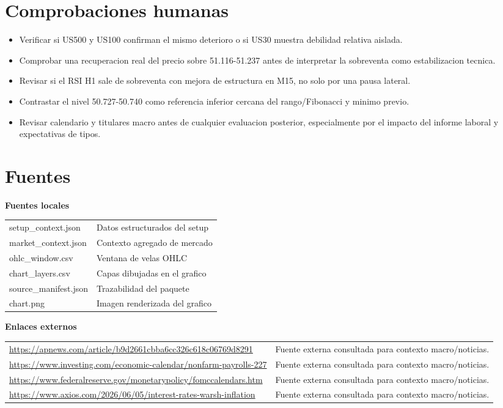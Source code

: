 \documentclass[11pt,a4paper]{article}
\begin{document}
\section*{Comprobaciones humanas}
\begin{itemize}
  \item Verificar si US500 y US100 confirman el mismo deterioro o si US30 muestra debilidad relativa aislada.
  \item Comprobar una recuperacion real del precio sobre 51.116-51.237 antes de interpretar la sobreventa como estabilizacion tecnica.
  \item Revisar si el RSI H1 sale de sobreventa con mejora de estructura en M15, no solo por una pausa lateral.
  \item Contrastar el nivel 50.727-50.740 como referencia inferior cercana del rango/Fibonacci y minimo previo.
  \item Revisar calendario y titulares macro antes de cualquier evaluacion posterior, especialmente por el impacto del informe laboral y expectativas de tipos.
\end{itemize}

\section*{Fuentes}
\textbf{Fuentes locales}\par
\begin{tabularx}{\textwidth}{p{4.2cm}X}
setup\_context.json & Datos estructurados del setup \\
market\_context.json & Contexto agregado de mercado \\
ohlc\_window.csv & Ventana de velas OHLC \\
chart\_layers.csv & Capas dibujadas en el grafico \\
source\_manifest.json & Trazabilidad del paquete \\
chart.png & Imagen renderizada del grafico \\
\end{tabularx}

\vspace{0.45em}
\textbf{Enlaces externos}\par
\begin{tabularx}{\textwidth}{p{7.4cm}X}
\href{\detokenize{https://apnews.com/article/b9d2661cbba6cc326c618c06769d8291}}{https://apnews.com/article/b9d2661cbba6cc326c618c06769d8291} & Fuente externa consultada para contexto macro/noticias. \\
\href{\detokenize{https://www.investing.com/economic-calendar/nonfarm-payrolls-227}}{https://www.investing.com/economic-calendar/nonfarm-payrolls-227} & Fuente externa consultada para contexto macro/noticias. \\
\href{\detokenize{https://www.federalreserve.gov/monetarypolicy/fomccalendars.htm}}{https://www.federalreserve.gov/monetarypolicy/fomccalendars.htm} & Fuente externa consultada para contexto macro/noticias. \\
\href{\detokenize{https://www.axios.com/2026/06/05/interest-rates-warsh-inflation}}{https://www.axios.com/2026/06/05/interest-rates-warsh-inflation} & Fuente externa consultada para contexto macro/noticias. \\
\end{tabularx}
\end{document}
